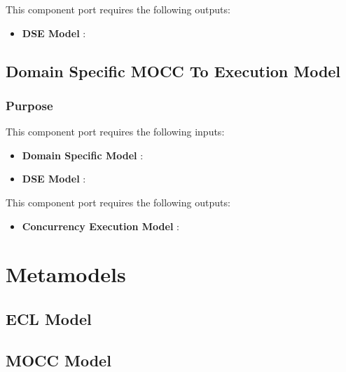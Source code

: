 \documentclass{gemoc} %
\begin{document}
This component port requires the following outputs:
\begin{itemize}
  \item \textbf{DSE Model} :
\end{itemize}

\subsection{Domain Specific MOCC To Execution Model}


\subsubsection{Purpose}

This component port requires the following inputs:
\begin{itemize}
  \item \textbf{Domain Specific Model} :
  \item \textbf{DSE Model} :
\end{itemize}

This component port requires the following outputs:
\begin{itemize}
  \item \textbf{Concurrency Execution Model} :
\end{itemize}

\section{Metamodels}
\subsection{ECL Model}


\subsection{MOCC Model}
\end{document}
